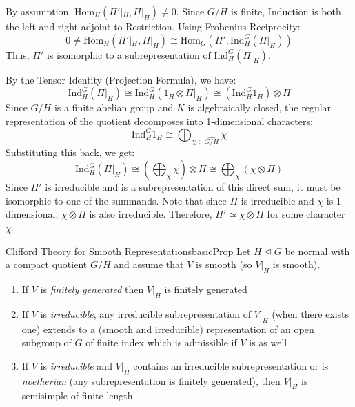 \documentclass{article}
\newcommand{\nsubg}{\trianglelefteq}
\begin{document}
\begin{Proof}
    By assumption, $\mathrm{Hom}_H(\Pi'|_H, \Pi|_H) \neq 0$. Since $G/H$ is finite, Induction is both the left and right adjoint to Restriction. Using Frobenius Reciprocity:
    \[ 0 \neq \mathrm{Hom}_H(\Pi'|_H, \Pi|_H) \cong \mathrm{Hom}_G(\Pi', \mathrm{Ind}_H^G(\Pi|_H)) \]
    Thus, $\Pi'$ is isomorphic to a subrepresentation of $\mathrm{Ind}_H^G(\Pi|_H)$.

    By the Tensor Identity (Projection Formula), we have:
    \[ \mathrm{Ind}_H^G(\Pi|_H) \cong \mathrm{Ind}_H^G(1_H \otimes \Pi|_H) \cong (\mathrm{Ind}_H^G 1_H) \otimes \Pi \]
    Since $G/H$ is a finite abelian group and $K$ is algebraically closed, the regular representation of the quotient decomposes into 1-dimensional characters:
    \[ \mathrm{Ind}_H^G 1_H \cong \bigoplus_{\chi \in \widehat{G/H}} \chi \]
    Substituting this back, we get:
    \[ \mathrm{Ind}_H^G(\Pi|_H) \cong \left( \bigoplus_{\chi} \chi \right) \otimes \Pi \cong \bigoplus_{\chi} (\chi \otimes \Pi) \]
    Since $\Pi'$ is irreducible and is a subrepresentation of this direct sum, it must be isomorphic to one of the summands. Note that since $\Pi$ is irreducible and $\chi$ is 1-dimensional, $\chi \otimes \Pi$ is also irreducible. Therefore, $\Pi' \simeq \chi \otimes \Pi$ for some character $\chi$.
\end{Proof}

\begin{prop}{Clifford Theory for Smooth Representations}{basicProp}
  Let $H\nsubg G$ be normal with a compact quotient $G/H$ and assume that $V$ is smooth (so $V|_H$ is smooth).

  \begin{enumerate}
    \item  If $V$ is \emph{finitely generated} then $V|_H$ is finitely generated %

  \item If $V$ is \emph{irreducible}, any irreducible subrepresentation of $V|_H$ (when there exists one)
    extends to a (smooth and irreducible) representation of an open subgroup of $G$ of finite index which is
    admissible if $V$ is as well%

  \item If $V$ is \emph{irreducible} and $V|_H$ contains an irreducible subrepresentation or is
    \emph{noetherian} (any subrepresentation is finitely generated), then $V|_H$ is semisimple of finite
    length %
  \end{enumerate}
\end{prop}
\end{document}
